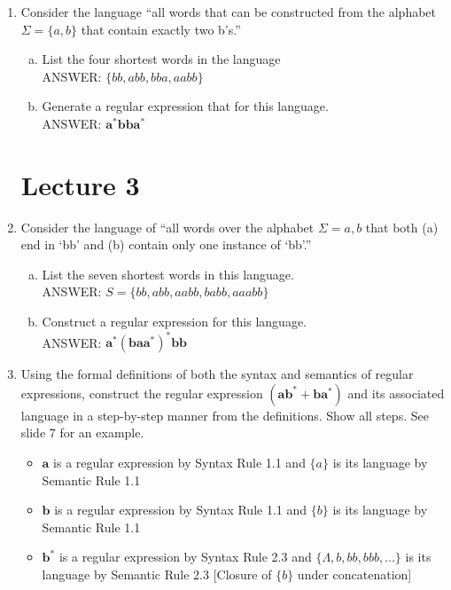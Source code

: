 \documentclass{article}
\begin{document}
\begin{enumerate}[1.]
    \item Consider the language ``all words that can be constructed from the
        alphabet $\Sigma = \{a, b\}$ that contain exactly two b's.''
        \begin{enumerate}[a)]
            \item List the four shortest words in the language \\
                ANSWER: $\{bb, abb, bba, aabb\}$
            \item Generate a regular expression that for this language. \\
                ANSWER: $\bm{a^*bba^*}$
        \end{enumerate}
        \section{Lecture 3}
    \item Consider the language of ``all words over the alphabet $\Sigma = {a, b}$
        that both (a) end in `bb' and (b) contain only one instance of `bb'.''
        \begin{enumerate}[a)]
            \item List the seven shortest words in this language. \\
                ANSWER: $S = \{bb, abb, aabb, babb, aaabb\}$
            \item Construct a regular expression for this language.\\
                ANSWER: $\bm{a^*(baa^*)^*bb}$
        \end{enumerate}

    \item Using the formal definitions of both the syntax and semantics of
        regular expressions, construct the regular expression $\bm{(ab^* +
        ba^*)}$ and its associated language in a step-by-step manner from the
        definitions. Show all steps. See slide 7 for an example.
        \begin{itemize}
            \item $\bm{a}$ is a regular expression by Syntax Rule 1.1 and
                $\{a\}$ is its language by Semantic Rule 1.1

            \item $\bm{b}$ is a regular expression by Syntax Rule 1.1 and
                $\{b\}$ is its language by Semantic Rule 1.1

            \item $\bm{b^*}$ is a regular expression by Syntax Rule 2.3 and
                $\{\Lambda, b, bb, bbb, \dots\}$ is its language by Semantic
                Rule 2.3 [Closure of $\{b\}$ under concatenation]


\end{itemize}
\end{enumerate}
\end{document}
